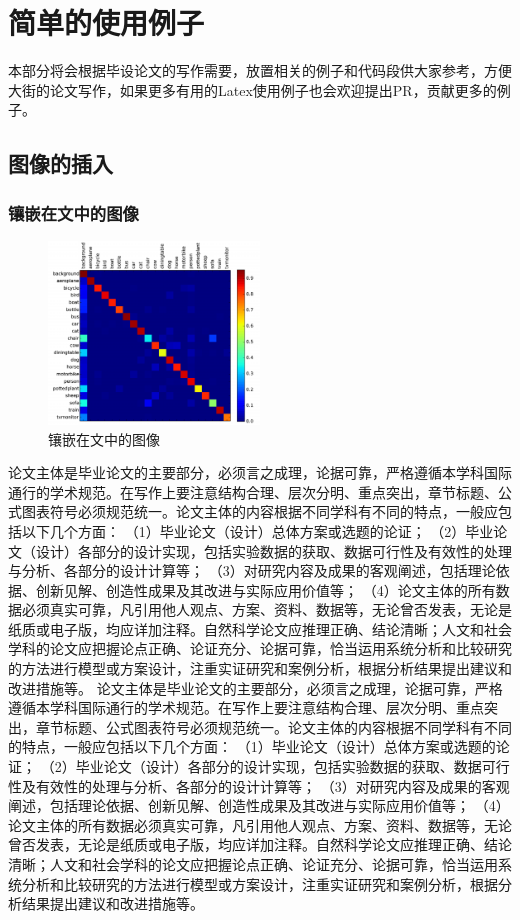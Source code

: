 \chapter{简单的使用例子}
\label{cha:usage-example}

本部分将会根据毕设论文的写作需要，放置相关的例子和代码段供大家参考，方便大街的论文写作，如果更多有用的Latex使用例子也会欢迎提出PR，贡献更多的例子。

\section{图像的插入}

\subsection{镶嵌在文中的图像}
\begin{figure}
	\centering
	\includegraphics[width=0.5\textwidth]{image/chap04/confusion.pdf}
	\caption{镶嵌在文中的图像}
	\label{fig:image-embedding-text}
\end{figure}
论文主体是毕业论文的主要部分，必须言之成理，论据可靠，严格遵循本学科国际通行的学术规范。在写作上要注意结构合理、层次分明、重点突出，章节标题、公式图表符号必须规范统一。论文主体的内容根据不同学科有不同的特点，一般应包括以下几个方面： （1）毕业论文（设计）总体方案或选题的论证； （2）毕业论文（设计）各部分的设计实现，包括实验数据的获取、数据可行性及有效性的处理与分析、各部分的设计计算等； （3）对研究内容及成果的客观阐述，包括理论依据、创新见解、创造性成果及其改进与实际应用价值等； （4）论文主体的所有数据必须真实可靠，凡引用他人观点、方案、资料、数据等，无论曾否发表，无论是纸质或电子版，均应详加注释。自然科学论文应推理正确、结论清晰；人文和社会学科的论文应把握论点正确、论证充分、论据可靠，恰当运用系统分析和比较研究的方法进行模型或方案设计，注重实证研究和案例分析，根据分析结果提出建议和改进措施等。
论文主体是毕业论文的主要部分，必须言之成理，论据可靠，严格遵循本学科国际通行的学术规范。在写作上要注意结构合理、层次分明、重点突出，章节标题、公式图表符号必须规范统一。论文主体的内容根据不同学科有不同的特点，一般应包括以下几个方面： （1）毕业论文（设计）总体方案或选题的论证； （2）毕业论文（设计）各部分的设计实现，包括实验数据的获取、数据可行性及有效性的处理与分析、各部分的设计计算等； （3）对研究内容及成果的客观阐述，包括理论依据、创新见解、创造性成果及其改进与实际应用价值等； （4）论文主体的所有数据必须真实可靠，凡引用他人观点、方案、资料、数据等，无论曾否发表，无论是纸质或电子版，均应详加注释。自然科学论文应推理正确、结论清晰；人文和社会学科的论文应把握论点正确、论证充分、论据可靠，恰当运用系统分析和比较研究的方法进行模型或方案设计，注重实证研究和案例分析，根据分析结果提出建议和改进措施等。



